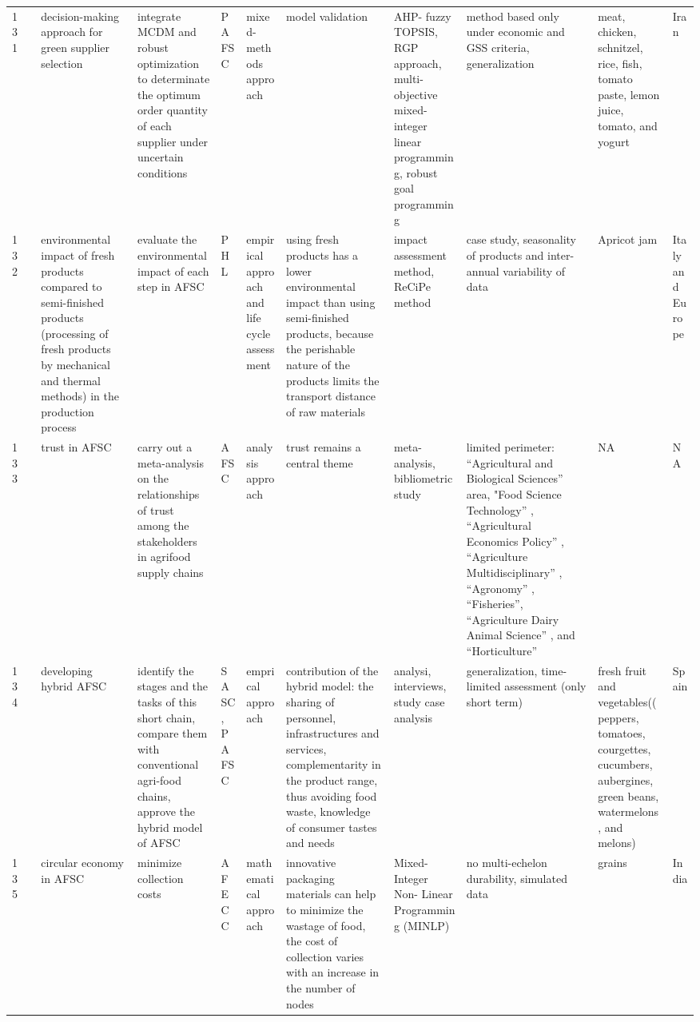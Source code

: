 \documentclass[a4paper,10pt]{article}
\begin{document}
\begin{landscape}
\begin{small}
\begin{longtable}{p{0.5cm} p{2cm} p{2.5cm} p{4cm} p{1cm} p{2.5cm} p{5.5cm} p{2.5cm} p{2.5cm} p{1.8cm} p{1.5cm}}
131 & \textcite{Tirkolaee156} &decision-making approach for green supplier selection &  integrate MCDM and robust optimization to determinate the optimum order quantity of each supplier under uncertain conditions &PAFSC &  mixed-methods approach & model validation &AHP- fuzzy TOPSIS,  RGP approach, multi-objective mixed-integer linear programming, robust goal programming  & method based only under economic and GSS criteria, generalization& meat, chicken, schnitzel, rice, fish, tomato paste, lemon juice, tomato, and yogurt& Iran  \\
132 & \textcite{Boenzi129} &environmental impact of fresh products compared to semi-finished products (processing of fresh products by mechanical and thermal methods) in the production process  & evaluate the environmental impact of each step in AFSC&PHL  & empirical approach and life cycle assessment& using fresh products has a lower environmental impact than using semi-finished products, because the perishable nature of the products limits the transport distance of raw materials&impact assessment method, ReCiPe method  & case study, seasonality of products and inter-annual variability of data& Apricot jam& Italy and Europe  \\
133 & \textcite{Assis130} &trust in AFSC & carry out a meta-analysis on the relationships of trust among the stakeholders in agrifood supply chains&AFSC & analysis approach& trust remains a central theme &meta-analysis, bibliometric study  & limited perimeter:  “Agricultural and Biological Sciences” area, "Food Science Technology” , “Agricultural Economics Policy” , “Agriculture Multidisciplinary” , “Agronomy” , “Fisheries”, “Agriculture Dairy Animal Science” , and “Horticulture” & NA& NA  \\
134 & \textcite{Navarro131} &developing hybrid AFSC& identify the stages and the tasks of this short chain, compare them with conventional agri-food chains, approve the hybrid model of AFSC&SASC,  PAFSC & emprical approach& contribution of the hybrid model: the sharing of personnel, infrastructures and services, complementarity in the product range, thus avoiding food waste, knowledge of consumer tastes and needs  &analysi, interviews, study case analysis    & generalization, time-limited assessment (only short term)& fresh fruit and vegetables((peppers, tomatoes, courgettes, cucumbers, aubergines, green beans, watermelons, and
melons)& Spain  \\
135 & \textcite{Prajapati133} &circular economy in AFSC & minimize  collection costs&AFECC & mathematical approach& innovative packaging materials can help to minimize the wastage of food, the cost of collection varies with an increase in the number of nodes& Mixed-Integer Non- Linear Programming (MINLP)   & no multi-echelon durability, simulated data& grains& India  \\

\end{longtable}
\end{small}
\end{landscape}
\end{document}
